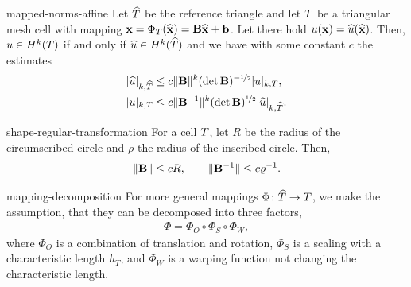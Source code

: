 \begin{Lemma}{mapped-norms-affine}
  Let $\widehat {T}$ be the reference triangle and let $T$ be a
  triangular mesh cell with mapping
  $\mathbf x = \Phi_T(\widehat{\mathbf x}) = \mathbf B \widehat{\mathbf x} + \mathbf b$. Let there hold
  $u(\mathbf x) = \widehat{u}(\widehat{\mathbf x})$. Then, $u\in H^k(T)$ if and only if
  $\widehat{u}\in H^k(\widehat {T})$ and we have with some constant $c$ the
  estimates
  \begin{gather}
    \begin{split}
      \lvert\widehat{u}\rvert_{k,\widehat {T}}
      &\le c \lVert\mathbf B\rVert^k (\det \mathbf B)^{-\nicefrac12}
      \lvert u\rvert_{k,T},\\
      \lvert u\rvert_{k,T}
      &\le c \lVert\mathbf B^{-1}\rVert^k (\det \mathbf B)^{\nicefrac12}
      \lvert\widehat{u}\rvert_{k,\widehat {T}}.
    \end{split}
  \end{gather}
\end{Lemma}

\begin{Lemma}{shape-regular-transformation}
  For a cell $T$, let $R$ be the radius of the circumscribed
  circle and $\rho$ the radius of the inscribed circle. Then,
  \begin{gather}
    \lVert\mathbf B\rVert \le c R, \qquad \lVert\mathbf B^{-1}\rVert \le c \varrho^{-1}.
  \end{gather}
\end{Lemma}

\begin{Assumption}{mapping-decomposition}
  For more general mappings $\Phi\colon \widehat {T}\to T$, we
  make the assumption, that they can be decomposed into three factors,
  \begin{gather}
    \Phi = \Phi_O \circ \Phi_S \circ \Phi_W,
  \end{gather}
  where $\Phi_O$ is a combination of translation and rotation,
  $\Phi_S$ is a scaling with a characteristic length $h_T$, and
  $\Phi_W$ is a warping function not changing the characteristic length.
\end{Assumption}

